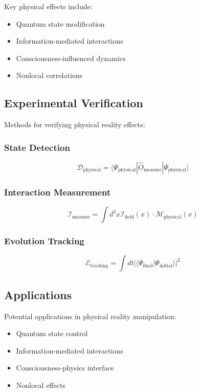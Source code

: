 Key physical effects include:

\begin{itemize}
    \item Quantum state modification
    \item Information-mediated interactions
    \item Consciousness-influenced dynamics
    \item Nonlocal correlations
\end{itemize}

\subsection{Experimental Verification}

Methods for verifying physical reality effects:

\subsubsection{State Detection}
\[
\mathcal{D}_{\text{physical}} = \langle \Psi_{\text{physical}}|\hat{O}_{\text{measure}}|\Psi_{\text{physical}}\rangle
\]

\subsubsection{Interaction Measurement}
\[
\mathcal{I}_{\text{measure}} = \int d^3x \mathcal{I}_{\text{field}}(x) \cdot \mathcal{M}_{\text{physical}}(x)
\]

\subsubsection{Evolution Tracking}
\[
\mathcal{E}_{\text{tracking}} = \int dt |\langle \Psi_{\text{final}}|\Psi_{\text{initial}}\rangle|^2
\]

\subsection{Applications}

Potential applications in physical reality manipulation:

\begin{itemize}
    \item Quantum state control
    \item Information-mediated interactions
    \item Consciousness-physics interface
    \item Nonlocal effects
\end{itemize} 